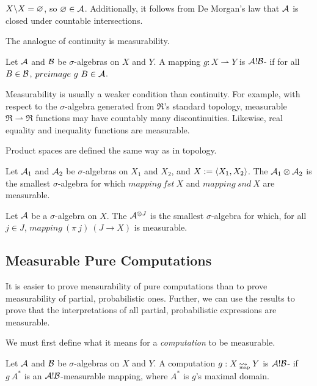 \documentclass{llncs}
\newcommand{\arrow}{\rightsquigarrow}
\newcommand{\pto}{\rightharpoonup}
\newcommand{\map}{_\mathrm{map}}
\DeclareMathOperator{\mapto}{\arrow_{\mspace{-21mu}\map}}
\begin{document}
$X \backslash X = \varnothing$, so $\varnothing \in \mathcal{A}$.
Additionally, it follows from De Morgan's law that $\mathcal{A}$ is closed under countable intersections.

The analogue of continuity is measurability.

\begin{definition}
Let $\mathcal{A}$ and $\mathcal{B}$ be $\sigma$-algebras on $X$ and $Y$.
A mapping $g : X \pto Y$ is $\mathcal{A}!\mathcal{B}$- if for all $B \in \mathcal{B}$, $preimage~g~B \in \mathcal{A}$.
\end{definition}

Measurability is usually a weaker condition than continuity.
For example, with respect to the $\sigma$-algebra generated from $\Re$'s standard topology, measurable $\Re \pto \Re$ functions may have countably many discontinuities.
Likewise, real equality and inequality functions are measurable.

Product spaces are defined the same way as in topology.

\begin{definition}
\label{def:finite-product-sigma-algebra}
Let $\mathcal{A}_1$ and $\mathcal{A}_2$ be $\sigma$-algebras on $X_1$ and $X_2$, and $X := \langle{X_1,X_2}\rangle$.
The  $\mathcal{A}_1 \otimes \mathcal{A}_2$ is the smallest $\sigma$-algebra for which $mapping~fst~X$ and $mapping~snd~X$ are measurable.%
\end{definition}

\begin{definition}
\label{def:arbitrary-product-sigma-algebra}
Let $\mathcal{A}$ be a $\sigma$-algebra on $X$.
The  $\mathcal{A}^{\otimes J}$ is the smallest $\sigma$-algebra for which, for all $j \in J$, $mapping~(\pi~j)~(J \to X)$ is measurable.%
\end{definition}

\subsection{Measurable Pure Computations}

It is easier to prove measurability of pure computations than to prove measurability of partial, probabilistic ones.
Further, we can use the results to prove that the interpretations of all partial, probabilistic expressions are measurable.

We must first define what it means for a \emph{computation} to be measurable.

\begin{definition}
\label{def:measurable-mapping-arrow-computation}
Let $\mathcal{A}$ and $\mathcal{B}$ be $\sigma$-algebras on $X$ and $Y$.
A computation $g : X \mapto Y$ is $\mathcal{A}!\mathcal{B}$- if $g~A^*$ is an $\mathcal{A}!\mathcal{B}$-measurable mapping, where $A^*$ is $g$'s maximal domain.%
\end{definition}
\end{document}
